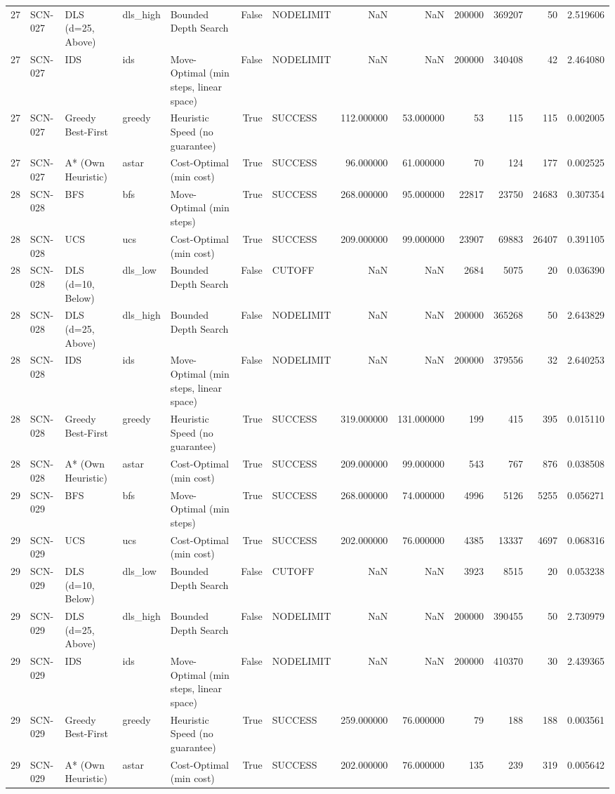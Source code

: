 \begin{table}[htbp]
\begin{tabular}{rllllrlrrrrrr}
27 & SCN-027 & DLS (d=25, Above) & dls\_high & Bounded Depth Search & False & NODELIMIT & NaN & NaN & 200000 & 369207 & 50 & 2.519606 \\
27 & SCN-027 & IDS & ids & Move-Optimal (min steps, linear space) & False & NODELIMIT & NaN & NaN & 200000 & 340408 & 42 & 2.464080 \\
27 & SCN-027 & Greedy Best-First & greedy & Heuristic Speed (no guarantee) & True & SUCCESS & 112.000000 & 53.000000 & 53 & 115 & 115 & 0.002005 \\
27 & SCN-027 & A* (Own Heuristic) & astar & Cost-Optimal (min cost) & True & SUCCESS & 96.000000 & 61.000000 & 70 & 124 & 177 & 0.002525 \\
28 & SCN-028 & BFS & bfs & Move-Optimal (min steps) & True & SUCCESS & 268.000000 & 95.000000 & 22817 & 23750 & 24683 & 0.307354 \\
28 & SCN-028 & UCS & ucs & Cost-Optimal (min cost) & True & SUCCESS & 209.000000 & 99.000000 & 23907 & 69883 & 26407 & 0.391105 \\
28 & SCN-028 & DLS (d=10, Below) & dls\_low & Bounded Depth Search & False & CUTOFF & NaN & NaN & 2684 & 5075 & 20 & 0.036390 \\
28 & SCN-028 & DLS (d=25, Above) & dls\_high & Bounded Depth Search & False & NODELIMIT & NaN & NaN & 200000 & 365268 & 50 & 2.643829 \\
28 & SCN-028 & IDS & ids & Move-Optimal (min steps, linear space) & False & NODELIMIT & NaN & NaN & 200000 & 379556 & 32 & 2.640253 \\
28 & SCN-028 & Greedy Best-First & greedy & Heuristic Speed (no guarantee) & True & SUCCESS & 319.000000 & 131.000000 & 199 & 415 & 395 & 0.015110 \\
28 & SCN-028 & A* (Own Heuristic) & astar & Cost-Optimal (min cost) & True & SUCCESS & 209.000000 & 99.000000 & 543 & 767 & 876 & 0.038508 \\
29 & SCN-029 & BFS & bfs & Move-Optimal (min steps) & True & SUCCESS & 268.000000 & 74.000000 & 4996 & 5126 & 5255 & 0.056271 \\
29 & SCN-029 & UCS & ucs & Cost-Optimal (min cost) & True & SUCCESS & 202.000000 & 76.000000 & 4385 & 13337 & 4697 & 0.068316 \\
29 & SCN-029 & DLS (d=10, Below) & dls\_low & Bounded Depth Search & False & CUTOFF & NaN & NaN & 3923 & 8515 & 20 & 0.053238 \\
29 & SCN-029 & DLS (d=25, Above) & dls\_high & Bounded Depth Search & False & NODELIMIT & NaN & NaN & 200000 & 390455 & 50 & 2.730979 \\
29 & SCN-029 & IDS & ids & Move-Optimal (min steps, linear space) & False & NODELIMIT & NaN & NaN & 200000 & 410370 & 30 & 2.439365 \\
29 & SCN-029 & Greedy Best-First & greedy & Heuristic Speed (no guarantee) & True & SUCCESS & 259.000000 & 76.000000 & 79 & 188 & 188 & 0.003561 \\
29 & SCN-029 & A* (Own Heuristic) & astar & Cost-Optimal (min cost) & True & SUCCESS & 202.000000 & 76.000000 & 135 & 239 & 319 & 0.005642 \\
\bottomrule
\end{tabular}

\end{table}
